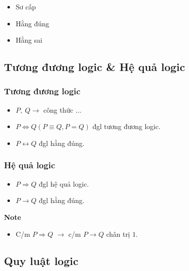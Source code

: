 \documentclass[11pt]{article}
\providecommand{\tightlist}{%
      \setlength{\itemsep}{0pt}\setlength{\parskip}{0pt}}
\begin{document}
    \begin{itemize}
\item
  Sơ cấp
\item
  Hằng đúng
\item
  Hằng sai
\end{itemize}

    \subsection{Tương đương logic \& Hệ quả
logic}\label{tux1b0ux1a1ng-ux111ux1b0ux1a1ng-logic-hux1ec7-quux1ea3-logic}

    \subsubsection{Tương đương
logic}\label{tux1b0ux1a1ng-ux111ux1b0ux1a1ng-logic}

    \begin{itemize}
\item
  \(P, \: Q \to\) công thức \(\ldots\)
\item
  \(P \Leftrightarrow Q (P \equiv Q, P = Q)\) đgl tương đương logic.
\item
  \(P \leftrightarrow Q\) đgl hằng đúng.
\end{itemize}

    \subsubsection{Hệ quả logic}\label{hux1ec7-quux1ea3-logic}

    \begin{itemize}
\tightlist
\item
  \(P \Rightarrow Q\) đgl hệ quả logic.
\item
  \(P \to Q\) đgl hằng đúng.
\end{itemize}

    \textbf{Note}

\begin{itemize}
\tightlist
\item
  C/m \(P \Rightarrow Q\) \(\to\) c/m \(P \to Q\) chân trị \(1\).
\end{itemize}

    \subsection{Quy luật logic}\label{quy-luux1eadt-logic}
\end{document}
